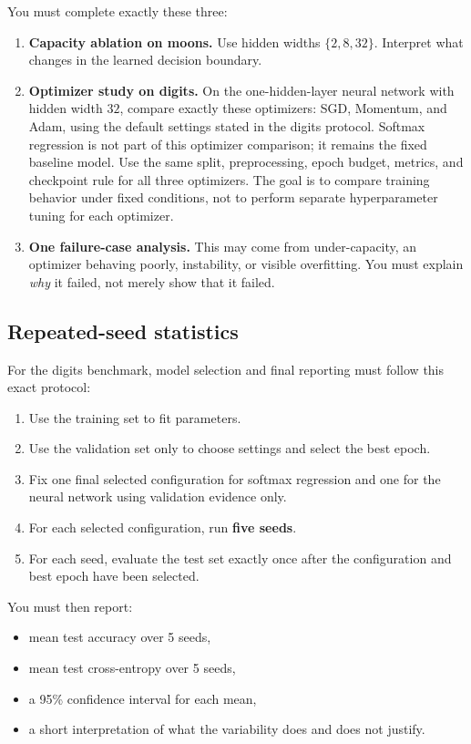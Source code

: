 \documentclass[11pt]{article}
\begin{document}
You must complete exactly these three:

\begin{enumerate}
    \item \textbf{Capacity ablation on moons.} Use hidden widths \(\{2, 8, 32\}\). Interpret what changes in the learned decision boundary.
    \item \textbf{Optimizer study on digits.} On the one-hidden-layer neural network with hidden width \(32\), compare exactly these optimizers: SGD, Momentum, and Adam, using the default settings stated in the digits protocol. Softmax regression is not part of this optimizer comparison; it remains the fixed baseline model. Use the same split, preprocessing, epoch budget, metrics, and checkpoint rule for all three optimizers. The goal is to compare training behavior under fixed conditions, not to perform separate hyperparameter tuning for each optimizer.
    \item \textbf{One failure-case analysis.} This may come from under-capacity, an optimizer behaving poorly, instability, or visible overfitting. You must explain \emph{why} it failed, not merely show that it failed.
\end{enumerate}

\subsection{Repeated-seed statistics}

For the digits benchmark, model selection and final reporting must follow this exact protocol:

\begin{enumerate}
    \item Use the training set to fit parameters.
    \item Use the validation set only to choose settings and select the best epoch.
    \item Fix one final selected configuration for softmax regression and one for the neural network using validation evidence only.
    \item For each selected configuration, run \textbf{five seeds}.
    \item For each seed, evaluate the test set exactly once after the configuration and best epoch have been selected.
\end{enumerate}

You must then report:

\begin{itemize}
    \item mean test accuracy over 5 seeds,
    \item mean test cross-entropy over 5 seeds,
    \item a 95\% confidence interval for each mean,
    \item a short interpretation of what the variability does and does not justify.
\end{itemize}
\end{document}
